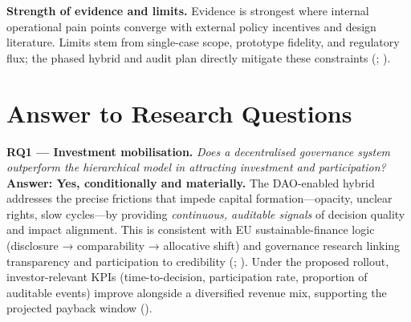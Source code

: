 \documentclass[
  english,
  12pt,
  oneside,
  open=any]{scrbook}
\begin{document}
\begin{tcolorbox}[enhanced jigsaw, colframe=quarto-callout-note-color-frame, coltitle=black, titlerule=0mm, opacitybacktitle=0.6, colback=white, toprule=.15mm, leftrule=.75mm, rightrule=.15mm, opacityback=0, toptitle=1mm, bottomtitle=1mm, bottomrule=.15mm, title=\textcolor{quarto-callout-note-color}{\faInfo}\hspace{0.5em}{Note}, arc=.35mm, left=2mm, colbacktitle=quarto-callout-note-color!10!white, breakable]

\textbf{Strength of evidence and limits.} Evidence is strongest where
internal operational pain points converge with external policy
incentives and design literature. Limits stem from single-case scope,
prototype fidelity, and regulatory flux; the phased hybrid and audit
plan directly mitigate these constraints
(;
).

\end{tcolorbox}

\section{Answer to Research Questions}\label{sec-rq-answers}

\textbf{RQ1 --- Investment mobilisation.} \emph{Does a decentralised
governance system outperform the hierarchical model in attracting
investment and participation?}\\
\textbf{Answer: Yes, conditionally and materially.} The DAO-enabled
hybrid addresses the precise frictions that impede capital
formation---opacity, unclear rights, slow cycles---by providing
\emph{continuous, auditable signals} of decision quality and impact
alignment. This is consistent with EU sustainable-finance logic
(disclosure → comparability → allocative shift) and governance research
linking transparency and participation to credibility
(; ). Under the proposed rollout, investor-relevant KPIs
(time-to-decision, participation rate, proportion of auditable events)
improve alongside a diversified revenue mix, supporting the projected
payback window ().
\end{document}
